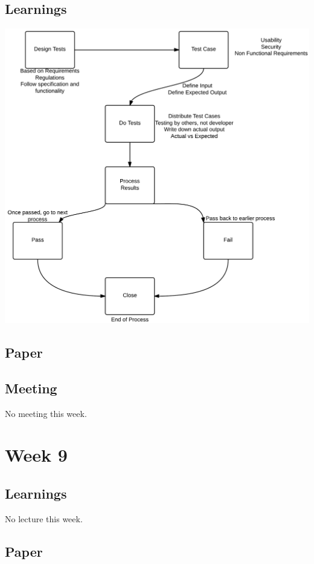 \section{Learnings}
\begin{center}
\includegraphics[scale=0.24]{testing.png}
\end{center}

\section{Paper}



\section{Meeting}

No meeting this week.

\chapter{Week 9}

\section{Learnings}

No lecture this week.

\section{Paper}


